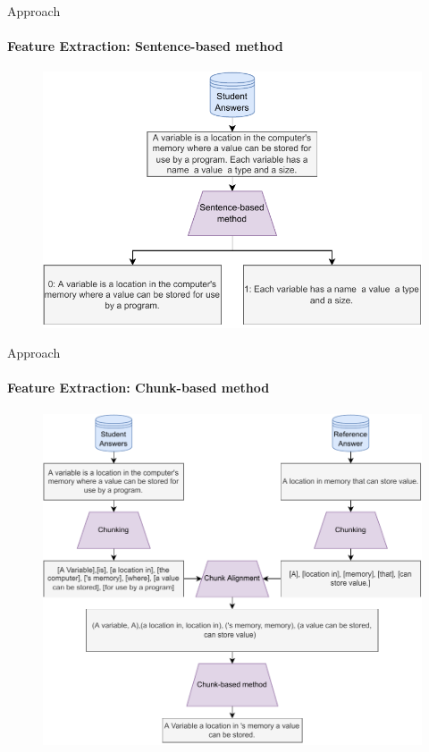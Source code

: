\documentclass[aspectratio=169]{beamer}
\begin{document}
\begin{frame}{Approach}
\framesubtitle{Feature Extraction: Sentence-based method}
\begin{figure}
\centering
\includegraphics[scale = 0.65]{images/sentence_FE.pdf}
\label{fig:sentence fe}
\end{figure}
\end{frame}
\begin{frame}{Approach}
\framesubtitle{Feature Extraction: Chunk-based method}
\begin{figure}
\centering
\includegraphics[scale = 0.5]{images/chunk_FE.pdf}
\label{fig:chunk fe}
\end{figure}
\end{frame}
\end{document}
